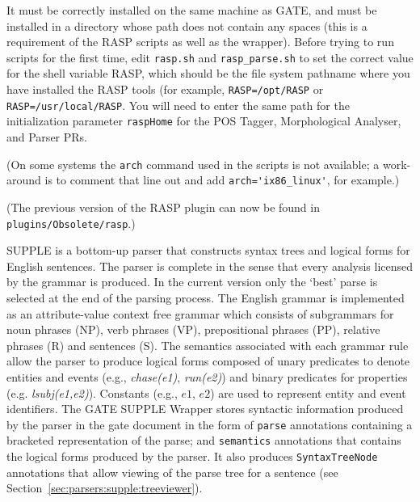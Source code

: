 It must be correctly installed on the same machine as GATE, and must
be installed in a directory whose path does not contain any spaces
(this is a requirement of the RASP scripts as well as the
wrapper). Before trying to run scripts for the first time, edit
\verb!rasp.sh! and \verb!rasp_parse.sh! to set the correct value
for the shell variable RASP, which should be the file system pathname
where you have installed the RASP tools (for example,
\texttt{RASP=/opt/RASP} or \texttt{RASP=/usr/local/RASP}.  You will
need to enter the same path for the initialization parameter
\texttt{raspHome} for the POS Tagger, Morphological Analyser, and
Parser PRs.

(On some systems the \texttt{arch} command used in the scripts is not
available; a work-around is to comment that line out and add
\verb!arch='ix86_linux'!, for example.)


(The previous version of the RASP plugin can now be found in
\verb!plugins/Obsolete/rasp!.)
%
%
\label{sec:parsers:buchart}

SUPPLE is a bottom-up parser that constructs syntax trees and logical forms for
English sentences. The parser is complete in the sense that every analysis
licensed by the grammar is produced. In the current version only the `best'
parse is selected at the end of the parsing process. The English grammar is
implemented as an attribute-value context free grammar which consists of
subgrammars for noun phrases (NP), verb phrases (VP), prepositional phrases
(PP), relative phrases (R) and sentences (S). The semantics associated with each
grammar rule allow the parser to produce logical forms composed of unary
predicates to denote entities and events (e.g., {\em chase(e1)}, {\em run(e2)})
and binary predicates for properties (e.g. {\em lsubj(e1,e2)}). Constants (e.g.,
$e1$, $e2$) are used to represent entity and event identifiers. The GATE SUPPLE
Wrapper stores syntactic information produced by the parser in the gate document
in the form of \texttt{parse} annotations containing a bracketed
representation of the parse; and \texttt{semantics} annotations that contains
the logical forms produced by the parser.  It also produces
\texttt{SyntaxTreeNode} annotations that allow viewing of the parse tree for a
sentence (see Section~\ref{sec:parsers:supple:treeviewer}).

